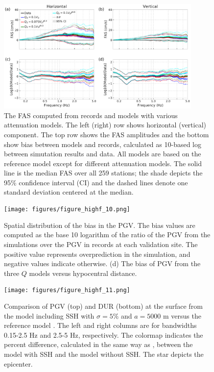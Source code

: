 \begin{figure}[!ht]
  \centering
  \includegraphics[width=0.9\textwidth,height=0.9\textheight,keepaspectratio]{figures/figure_highf_9.pdf}
  \caption{The FAS computed from records and models with various attenuation models. The left (right) row shows horizontal (vertical) component. The top row shows the FAS amplitudes and the bottom show bias between models and records, calculated as 10-based log between simutation results and data. All models are based on the reference model except for different attenuation models. The solid line is the median FAS over all 259 stations; the shade depicts the 95\% confidence interval (CI) and the dashed lines denote one standard deviation centered at the median.
  }
  \label{fig:highf-9}
\end{figure}
\clearpage

\begin{figure}[!ht]
  \centering
  \texttt{[image: figures/figure\_highf\_10.png]}
  \caption{Spatial distribution of the bias in the PGV. The bias values are computed as the base 10 logarithm of the ratio of the PGV from the simulations over the PGV in records at each validation site. The positive value represents overprediction in the simulation, and negative values indicate otherwise. (d) The bias of PGV from the three $Q$ models versus hypocentral distance.
  }
  \label{fig:highf-10}
\end{figure}
\clearpage


\begin{figure}[!ht]
  \centering
  \texttt{[image: figures/figure\_highf\_11.png]}
  \caption{Comparison of PGV (top) and DUR (bottom) at the surface from the model including SSH with $\sigma = 5\%$ and $a = 5000$ m versus the reference model . The left and right columns are for bandwidths 0.15-2.5 Hz and 2.5-5 Hz, respectively. The colormap indicates the percent difference, calculated in the same way as , between the model with SSH and the model without SSH. The star depicts the epicenter.
  }
  \label{fig:highf-11}
\end{figure}
\clearpage


